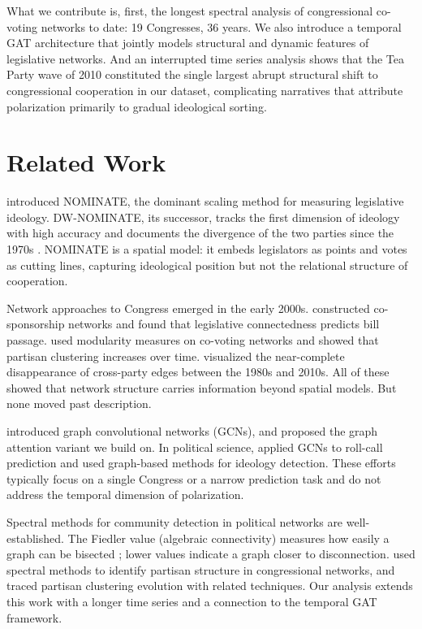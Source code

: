 \documentclass[12pt, a4paper]{article}
\begin{document}
What we contribute is, first, the longest spectral analysis of congressional co-voting networks to date: 19 Congresses, 36 years. We also introduce a temporal GAT architecture that jointly models structural and dynamic features of legislative networks. And an interrupted time series analysis shows that the Tea Party wave of 2010 constituted the single largest abrupt structural shift to congressional cooperation in our dataset, complicating narratives that attribute polarization primarily to gradual ideological sorting.

\section{Related Work}

\citet{poole1985} introduced NOMINATE, the dominant scaling method for measuring legislative ideology. DW-NOMINATE, its successor, tracks the first dimension of ideology with high accuracy and documents the divergence of the two parties since the 1970s \citep{poole2017}. NOMINATE is a spatial model: it embeds legislators as points and votes as cutting lines, capturing ideological position but not the relational structure of cooperation.

Network approaches to Congress emerged in the early 2000s. \citet{fowler2006a} constructed co-sponsorship networks and found that legislative connectedness predicts bill passage. \citet{waugh2009} used modularity measures on co-voting networks and showed that partisan clustering increases over time. \citet{andris2015} visualized the near-complete disappearance of cross-party edges between the 1980s and 2010s. All of these showed that network structure carries information beyond spatial models. But none moved past description.

\citet{kipf2017} introduced graph convolutional networks (GCNs), and \citet{velickovic2018} proposed the graph attention variant we build on. In political science, \citet{li2021} applied GCNs to roll-call prediction and \citet{yang2020} used graph-based methods for ideology detection. These efforts typically focus on a single Congress or a narrow prediction task and do not address the temporal dimension of polarization.

Spectral methods for community detection in political networks are well-established. The Fiedler value (algebraic connectivity) measures how easily a graph can be bisected \citep{fiedler1973}; lower values indicate a graph closer to disconnection. \citet{newman2006} used spectral methods to identify partisan structure in congressional networks, and \citet{moody2013} traced partisan clustering evolution with related techniques. Our analysis extends this work with a longer time series and a connection to the temporal GAT framework.
\end{document}
